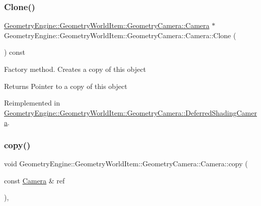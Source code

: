 \subsubsection{\texorpdfstring{Clone()}{Clone()}}
{\footnotesize\ttfamily \mbox{\hyperlink{class_geometry_engine_1_1_geometry_world_item_1_1_geometry_camera_1_1_camera}{Geometry\+Engine\+::\+Geometry\+World\+Item\+::\+Geometry\+Camera\+::\+Camera}} $\ast$ Geometry\+Engine\+::\+Geometry\+World\+Item\+::\+Geometry\+Camera\+::\+Camera\+::\+Clone (\begin{DoxyParamCaption}{ }\end{DoxyParamCaption}) const\hspace{0.3cm}{\ttfamily [virtual]}}

Factory method. Creates a copy of this object \begin{DoxyReturn}{Returns}
Pointer to a copy of this object 
\end{DoxyReturn}


Reimplemented in \mbox{\hyperlink{class_geometry_engine_1_1_geometry_world_item_1_1_geometry_camera_1_1_deferred_shading_camera_ac020fe14bc32f3fdbd0c9423af1c975f}{Geometry\+Engine\+::\+Geometry\+World\+Item\+::\+Geometry\+Camera\+::\+Deferred\+Shading\+Camera}}.

\mbox{\label{class_geometry_engine_1_1_geometry_world_item_1_1_geometry_camera_1_1_camera_a821e388a441a9b4a80e8384fc79170e3}} 
\subsubsection{\texorpdfstring{copy()}{copy()}}
{\footnotesize\ttfamily void Geometry\+Engine\+::\+Geometry\+World\+Item\+::\+Geometry\+Camera\+::\+Camera\+::copy (\begin{DoxyParamCaption}\item[{const \mbox{\hyperlink{class_geometry_engine_1_1_geometry_world_item_1_1_geometry_camera_1_1_camera}{Camera}} \&}]{ref }\end{DoxyParamCaption})\hspace{0.3cm}{\ttfamily [protected]}, {\ttfamily [virtual]}}

